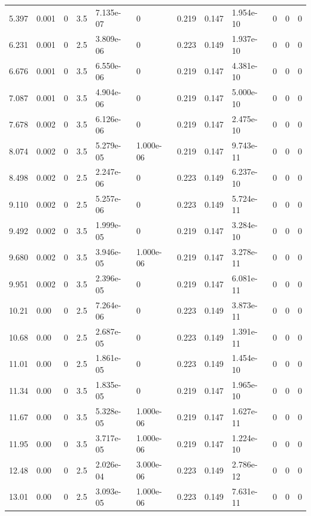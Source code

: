\documentclass[preview]{standalone}
\begin{document}
{{\begin{tabular}{L{1.2cm}C{1.2cm} C{0.3cm}C{0.5cm} C{1.4cm}C{1.4cm} C{1.4cm}C{1.4cm} C{1.6cm}C{1.6cm} C{1.6cm}C{1.6cm}}
  5.397  &  0.001  & 0     & 3.5 &  7.135e-07  & 0  &  0.219&   0.147& 1.954e-10 & 0   &  0 & 0  \\ 
  6.231  &  0.001  & 0     & 2.5 &  3.809e-06  & 0  &  0.223&   0.149& 1.937e-10 & 0   &  0 & 0  \\ 
  6.676  &  0.001  & 0     & 3.5 &  6.550e-06  & 0  &  0.219&   0.147& 4.381e-10 & 0   &  0 & 0  \\ 
  7.087  &  0.001  & 0     & 3.5 &  4.904e-06  & 0  &  0.219&   0.147& 5.000e-10 & 0   &  0 & 0  \\ 
  7.678  &  0.002  & 0     & 3.5 &  6.126e-06  & 0  &  0.219&   0.147& 2.475e-10 & 0   &  0 & 0  \\ 
  8.074  &  0.002  & 0     & 3.5 &  5.279e-05  & 1.000e-06  &  0.219&   0.147& 9.743e-11 & 0   &  0 & 0  \\ 
  8.498  &  0.002  & 0     & 2.5 &  2.247e-06  & 0  &  0.223&   0.149& 6.237e-10 & 0   &  0 & 0  \\ 
  9.110  &  0.002  & 0     & 2.5 &  5.257e-06  & 0  &  0.223&   0.149& 5.724e-11 & 0   &  0 & 0  \\ 
  9.492  &  0.002  & 0     & 3.5 &  1.999e-05  & 0  &  0.219&   0.147& 3.284e-10 & 0   &  0 & 0  \\ 
  9.680  &  0.002  & 0     & 3.5 &  3.946e-05  & 1.000e-06  &  0.219&   0.147& 3.278e-11 & 0   &  0 & 0  \\ 
  9.951  &  0.002  & 0     & 3.5 &  2.396e-05  & 0  &  0.219&   0.147& 6.081e-11 & 0   &  0 & 0  \\ 
  10.21  &  0.00  & 0     & 2.5 &  7.264e-06  & 0  &  0.223&   0.149& 3.873e-11 & 0   &  0 & 0  \\ 
  10.68  &  0.00  & 0     & 2.5 &  2.687e-05  & 0  &  0.223&   0.149& 1.391e-11 & 0   &  0 & 0  \\ 
  11.01  &  0.00  & 0     & 2.5 &  1.861e-05  & 0  &  0.223&   0.149& 1.454e-10 & 0   &  0 & 0  \\ 
  11.34  &  0.00  & 0     & 3.5 &  1.835e-05  & 0  &  0.219&   0.147& 1.965e-10 & 0   &  0 & 0  \\ 
  11.67  &  0.00  & 0     & 3.5 &  5.328e-05  & 1.000e-06  &  0.219&   0.147& 1.627e-11 & 0   &  0 & 0  \\ 
  11.95  &  0.00  & 0     & 3.5 &  3.717e-05  & 1.000e-06  &  0.219&   0.147& 1.224e-10 & 0   &  0 & 0  \\ 
  12.48  &  0.00  & 0     & 2.5 &  2.026e-04  & 3.000e-06  &  0.223&   0.149& 2.786e-12 & 0   &  0 & 0  \\ 
  13.01  &  0.00  & 0     & 2.5 &  3.093e-05  & 1.000e-06  &  0.223&   0.149& 7.631e-11 & 0   &  0 & 0  \\ 

\end{tabular}}}
\end{document}
